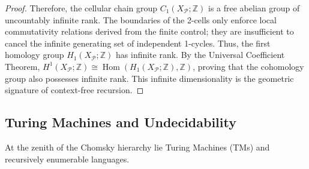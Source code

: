 \begin{proof}
Therefore, the cellular chain group $C_1(X_\mathcal{P}; \mathbb{Z})$ is a free abelian group of uncountably infinite rank. The boundaries of the 2-cells only enforce local commutativity relations derived from the finite control; they are insufficient to cancel the infinite generating set of independent 1-cycles. Thus, the first homology group $H_1(X_\mathcal{P}; \mathbb{Z})$ has infinite rank. By the Universal Coefficient Theorem, $H^1(X_\mathcal{P}; \mathbb{Z}) \cong \operatorname{Hom}(H_1(X_\mathcal{P}; \mathbb{Z}), \mathbb{Z})$, proving that the cohomology group also possesses infinite rank. This infinite dimensionality is the geometric signature of context-free recursion.
\end{proof}

\subsection{Turing Machines and Undecidability}

At the zenith of the Chomsky hierarchy lie Turing Machines (TMs) and recursively enumerable languages.

